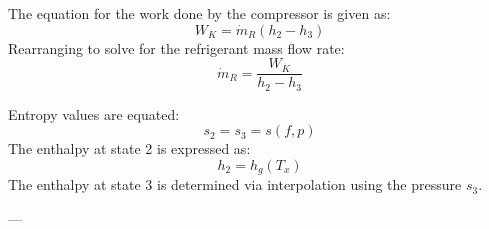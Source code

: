The equation for the work done by the compressor is given as:  
\[
W_K = \dot{m}_R (h_2 - h_3)
\]  
Rearranging to solve for the refrigerant mass flow rate:  
\[
\dot{m}_R = \frac{W_K}{h_2 - h_3}
\]  

Entropy values are equated:  
\[
s_2 = s_3 = s(f, p)
\]  
The enthalpy at state 2 is expressed as:  
\[
h_2 = h_g(T_x)
\]  
The enthalpy at state 3 is determined via interpolation using the pressure \( s_3 \).

---